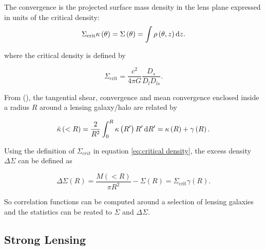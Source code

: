 \documentclass{beamer}
\begin{document}
  \begin{frame}
    The convergence is the projected surface mass density in the lens plane expressed in units of the critical density:
    \begin{equation} \label{eq:sigma_kappa}
      \Sigma_{\text{crit}} \kappa\left( \theta \right) = \Sigma\left( \theta \right) = \int\rho\left( \theta, z \right) \dif z.
    \end{equation}

    where the critical density is defined by

    \begin{equation} \label{eq:critical density}
      \Sigma_{\text{crit}} = \frac{c^2}{4\pi G}\frac{D_{s}}{D_{l}D_{ls}}.
    \end{equation}
  \end{frame}

  \begin{frame}
    From (\cite{agn}), the tangential shear, convergence and mean convergence enclosed inside a radius $R$ around a lensing galaxy/halo are related by

    \begin{equation} \label{eq:mean kappa}
      \bar{\kappa}\left( <R \right) = \frac{2}{R^2} \int_0^R \kappa \left( R' \right)R'\dif R' = \kappa \left( R \right) + \gamma \left( R \right).
    \end{equation}

    Using the definition of $\Sigma_{crit}$ in equation \ref{eq:critical density}, the excess density $\Delta\Sigma$ can be defined as

    \begin{equation} \label{eq:delta sigma}
      \Delta\Sigma\left( R \right) = \frac{M\left( <R \right)}{\pi R^2} - \Sigma\left( R \right) = \Sigma_{\text{crit}}\gamma\left( R \right).
    \end{equation}

    So correlation functions can be computed around a selection of lensing galaxies and the statistics can be reated to $\Sigma$ and $\Delta\Sigma$.
  \end{frame}

  \subsection{Strong Lensing}
\end{document}
